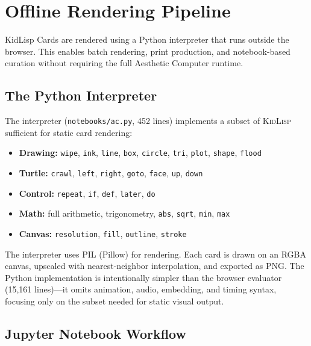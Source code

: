 \documentclass[10pt,letterpaper,twocolumn]{article}
\newcommand{\kidlisp}{\textsc{KidLisp}}
\begin{document}

\section{Offline Rendering Pipeline}
\label{sec:pipeline}

KidLisp Cards are rendered using a Python interpreter that runs outside the browser. This enables batch rendering, print production, and notebook-based curation without requiring the full Aesthetic Computer runtime.

\subsection{The Python Interpreter}

The interpreter (\texttt{notebooks/ac.py}, 452 lines) implements a subset of \kidlisp{} sufficient for static card rendering:

\begin{itemize}
  \item \textbf{Drawing:} \texttt{wipe}, \texttt{ink}, \texttt{line}, \texttt{box}, \texttt{circle}, \texttt{tri}, \texttt{plot}, \texttt{shape}, \texttt{flood}
  \item \textbf{Turtle:} \texttt{crawl}, \texttt{left}, \texttt{right}, \texttt{goto}, \texttt{face}, \texttt{up}, \texttt{down}
  \item \textbf{Control:} \texttt{repeat}, \texttt{if}, \texttt{def}, \texttt{later}, \texttt{do}
  \item \textbf{Math:} full arithmetic, trigonometry, \texttt{abs}, \texttt{sqrt}, \texttt{min}, \texttt{max}
  \item \textbf{Canvas:} \texttt{resolution}, \texttt{fill}, \texttt{outline}, \texttt{stroke}
\end{itemize}

The interpreter uses PIL (Pillow) for rendering. Each card is drawn on an RGBA canvas, upscaled with nearest-neighbor interpolation, and exported as PNG. The Python implementation is intentionally simpler than the browser evaluator (15,161 lines)---it omits animation, audio, embedding, and timing syntax, focusing only on the subset needed for static visual output.

\subsection{Jupyter Notebook Workflow}
\end{document}
